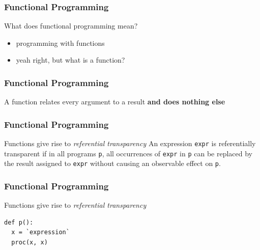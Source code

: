 \begin{frame}
\frametitle{Functional Programming}
\begin{block}{What does functional programming mean?}
\begin{itemize}
\item<1> programming with functions
\item<2> yeah right, but what is a function?
\end{itemize}
\end{block}
\end{frame}


\begin{frame}
\frametitle{Functional Programming}
\begin{block}{A function}
relates every argument to a result \textbf{and does nothing else}
\end{block}
\end{frame}


\begin{frame}
\frametitle{Functional Programming}
\begin{block}{Functions give rise to \emph{referential transparency}}
An expression \lstinline$expr$ is referentially transparent if in all programs \lstinline$p$,
all occurrences of \lstinline$expr$ in \lstinline$p$ can be replaced by the result assigned
to \lstinline$expr$ without causing an observable effect on \lstinline$p$.
\end{block}
\end{frame}


\begin{frame}[fragile]
\frametitle{Functional Programming}
\begin{block}{Functions give rise to \emph{referential transparency}}
\begin{lstlisting}[style=python,mathescape]
def p(): 
  x = `expression`
  proc(x, x)
\end{lstlisting}
\end{block}
\end{frame}



